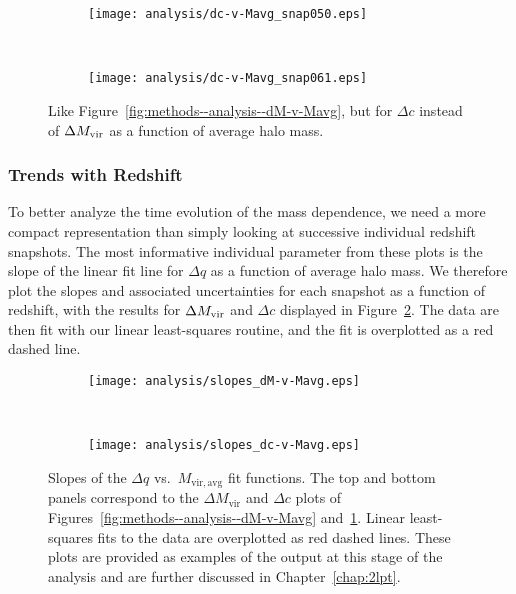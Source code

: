 \begin{figure*}[t]
	\centering
	\begin{subfigure}{}
		\texttt{[image: analysis/dc-v-Mavg\_snap050.eps]}
	\end{subfigure}
	\\
	\begin{subfigure}{}
		\texttt{[image: analysis/dc-v-Mavg\_snap061.eps]}
	\end{subfigure}
	\caption[$\Delta c$ as a function of $M_{\mathrm{vir,avg}}$]{\footnotesize Like Figure~\ref{fig:methods--analysis--dM-v-Mavg}, but for $\Delta c$ instead of $\Delta {M_{\mathrm{vir}}}$ as a function of average halo mass.}
	\label{fig:methods--analysis--dc-v-Mavg}
\end{figure*}



\subsubsection{Trends with Redshift}
\label{subsubsec:analysis--mass_trends--redshift_trends}


To better analyze the time evolution of the mass dependence, we need a more compact representation than simply looking at successive individual redshift snapshots.  The most informative individual parameter from these plots is the slope of the linear fit line for $\Delta q$ as a function of average halo mass.  We therefore plot the slopes and associated uncertainties for each snapshot as a function of redshift, with the results for $\Delta {M_{\mathrm{vir}}}$ and $\Delta c$ displayed in Figure~\ref{fig:methods--analysis--slopes_delta-v-Mavg}.  The data are then fit with our linear least-squares routine, and the fit is overplotted as a red dashed line.

\begin{figure*}[t]
	\centering
	\begin{subfigure}{}
		\texttt{[image: analysis/slopes\_dM-v-Mavg.eps]}
	\end{subfigure}
	\\
	\begin{subfigure}{}
		\texttt{[image: analysis/slopes\_dc-v-Mavg.eps]}
	\end{subfigure}
	\caption[Slopes of the $\Delta q$ vs.\ $M_{\mathrm{vir,avg}}$ fit functions.]{\footnotesize Slopes of the $\Delta q$ vs.\ $M_{\mathrm{vir,avg}}$ fit functions.  The top and bottom panels correspond to the $\Delta M_{\mathrm{vir}}$ and $\Delta c$ plots of Figures~\ref{fig:methods--analysis--dM-v-Mavg} and~\ref{fig:methods--analysis--dc-v-Mavg}.  Linear least-squares fits to the data are overplotted as red dashed lines.  These plots are provided as examples of the output at this stage of the analysis and are further discussed in Chapter~\ref{chap:2lpt}.}
	\label{fig:methods--analysis--slopes_delta-v-Mavg}
\end{figure*}




